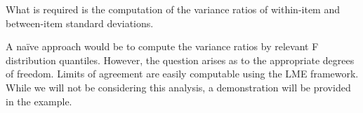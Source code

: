 \documentclass[12pt, a4paper]{report}
\theoremstyle{plain}
\theoremstyle{definition}
\theoremstyle{remark}
\begin{document}
What is required is the computation of the variance ratios of within-item and between-item standard deviations.  

A naïve approach would be to compute the variance ratios by relevant F distribution quantiles. However, the question arises as to the appropriate degrees of freedom.
Limits of agreement are easily computable using the LME framework. While we will not be considering this analysis, a demonstration will be provided in the example.






%
%
%
%
%
%
%
\end{document}
